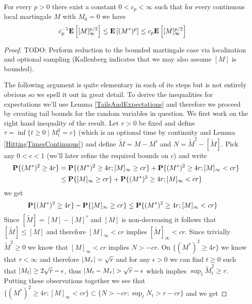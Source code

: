 \begin{thm}\label{BDGInequalities}For every $p > 0$ there exist a constant $0 < c_p < \infty$ such that for every continuous local martingale $M$ with $M_0 = 0$ we have
\begin{align*}
c_p^{-1} \textbf{E}\left[[M]^{p/2}_\infty\right] &\leq \textbf{E}\left[(M^*)^p\right] \leq c_p \textbf{E}\left[[M]^{p/2}_\infty\right]
\end{align*}
\end{thm}
\begin{proof}
TODO: Perform reduction to the bounded martingale case via localization and optional sampling (Kallenberg indicates that we may also assume $[M]$ is bounded).

The following argument is quite elementary in each of its steps but is not entirely obvious so we spell it out in great detail.  To derive the inequalities for expectations we'll use Lemma \ref{TailsAndExpectations} and therefore we proceed by creating tail bounds for the random variables in question.  We first work on the right hand inequality of the result.  Let $r > 0$ be fixed and define $\tau = \inf \lbrace t \geq 0 \mid M_t^2 = r \rbrace$ (which is an optional time by continuity and Lemma \ref{HittingTimesContinuous}) and define $\tilde{M} = M - M^\tau$ and $N = \tilde{M}^2 - [\tilde{M}]$.  Pick any $0 < c < 1$ (we'll later refine the required bounds on $c$) and write
\begin{align*}
\textbf{P}\{(M^*)^2 \geq 4r\} &= \textbf{P}\{(M^*)^2 \geq 4r ; [M]_\infty \geq cr\} + \textbf{P}\{(M^*)^2 \geq 4r; [M]_\infty < cr\} \\
&\leq \textbf{P}\{[M]_\infty \geq cr\} + \textbf{P}\{(M^*)^2 \geq 4r; [M]_\infty < cr\} 
\end{align*}
we get
\begin{align*}
\textbf{P}\{(M^*)^2 \geq 4r\} - \textbf{P}\{[M]_\infty \geq cr\} &\leq \textbf{P}\{(M^*)^2 \geq 4r; [M]_\infty < cr\} 
\end{align*}
Since $[\tilde{M}] = [M] - [M]^\tau$ and $[M]$ is non-decreasing it follows that $[\tilde{M}] \leq [M]$ and therefore $[M]_\infty < cr$ implies $[\tilde{M}]_\infty < cr$.  Since trivially $\tilde{M}^2 \geq 0$ we know that $[M]_\infty < cr$ implies $N > -cr$.  On $\lbrace (M^*)^2 \geq 4r \rbrace$ we know that $\tau < \infty$ and therefore $\left \vert M_\tau \right \vert = \sqrt{r}$ and for any $\epsilon > 0$ we can find $t \geq 0$ such that $\left \vert M_t \right \vert \geq 2\sqrt{r} - \epsilon$, thus $\left \vert M_t - M_\tau \right \vert > \sqrt{r} - \epsilon$ which implies $\sup_t \tilde{M}^2_t \geq r$.  Putting these observations together we see that $\lbrace (M^*)^2 \geq 4r; [M]_\infty < cr \rbrace \subset \lbrace N > -cr; \sup_t N_t > r - cr \rbrace$ and we get 

\end{proof}
